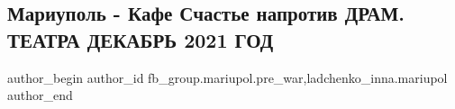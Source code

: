  
 
 
 
 

\subsection{Мариуполь - Кафе Счастье напротив ДРАМ. ТЕАТРА ДЕКАБРЬ 2021 ГОД}
\label{sec:28_01_2023.fb.fb_group.mariupol.pre_war.2.mariupol___kafe_scha}
 
\ifcmt
 author_begin
   author_id fb_group.mariupol.pre_war,ladchenko_inna.mariupol
 author_end
\fi
